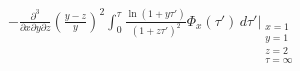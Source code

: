 \documentclass[11pt]{article}
\begin{document}
\begin{align}\label{eq:first_term}
    \quad& -\frac{\partial^3}{\partial x \partial y \partial z} \left(\frac{y-z}{y}\right)^2 \int_0^{\tau} \frac{\ln(1+y\tau')}{(1+z\tau')^2} \Phi_x(\tau') \,d\tau'\Bigg\vert_{\substack{x=1 \\ y=1 \\ z=2 \\ \tau=\infty}} %

\end{align}
\end{document}
